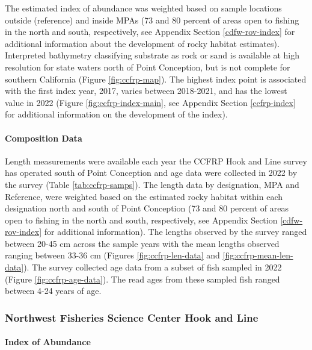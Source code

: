 \documentclass[11pt,
  english,
  letterpaper,
]{article}
\begin{document}
The estimated index of abundance was weighted based on sample locations outside (reference) and inside MPAs (73 and 80 percent of areas open to fishing in the north and south, respectively, see Appendix Section \ref{cdfw-rov-index} for additional information about the development of rocky habitat estimates). Interpreted bathymetry classifying substrate as rock or sand is available at high resolution for state waters north of Point Conception, but is not complete for southern California (Figure \ref{fig:ccfrp-map}). The highest index point is associated with the first index year, 2017, varies between 2018-2021, and has the lowest value in 2022 (Figure \ref{fig:ccfrp-index-main}, see Appendix Section \ref{ccfrp-index} for additional information on the development of the index).

\hypertarget{composition-data-2}{%
\paragraph{Composition Data}\label{composition-data-2}}

\hfill\break

Length measurements were available each year the CCFRP Hook and Line survey has operated south of Point Conception and age data were collected in 2022 by the survey (Table \ref{tab:ccfrp-samps}). The length data by designation, MPA and Reference, were weighted based on the estimated rocky habitat within each designation north and south of Point Conception (73 and 80 percent of areas open to fishing in the north and south, respectively, see Appendix Section \ref{cdfw-rov-index} for additional information). The lengths observed by the survey ranged between 20-45 cm across the sample years with the mean lengths observed ranging between 33-36 cm (Figures \ref{fig:ccfrp-len-data} and \ref{fig:ccfrp-mean-len-data}). The survey collected age data from a subset of fish sampled in 2022 (Figure \ref{fig:ccfrp-age-data}). The read ages from these sampled fish ranged between 4-24 years of age.

\hypertarget{northwest-fisheries-science-center-hook-and-line}{%
\subsubsection{Northwest Fisheries Science Center Hook and Line}\label{northwest-fisheries-science-center-hook-and-line}}

\hypertarget{index-of-abundance-1}{%
\paragraph{Index of Abundance}\label{index-of-abundance-1}}
\end{document}
